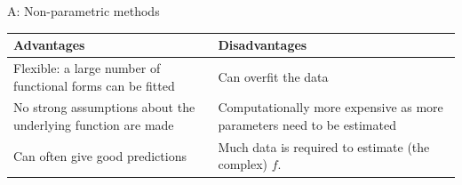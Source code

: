 \documentclass[ignorenonframetext,]{beamer}
\begin{document}
\begin{frame}

\begin{block}{A: Non-parametric methods}

\begin{longtable}[]{@{}ll@{}}
\toprule
\begin{minipage}[b]{0.47\columnwidth}\raggedright\strut
Advantages\strut
\end{minipage} & \begin{minipage}[b]{0.47\columnwidth}\raggedright\strut
Disadvantages\strut
\end{minipage}\tabularnewline
\midrule
\endhead
\begin{minipage}[t]{0.47\columnwidth}\raggedright\strut
Flexible: a large number of functional forms can be fitted\strut
\end{minipage} & \begin{minipage}[t]{0.47\columnwidth}\raggedright\strut
Can overfit the data\vspace{2mm}\strut
\end{minipage}\tabularnewline
\begin{minipage}[t]{0.47\columnwidth}\raggedright\strut
No strong assumptions about the underlying function are made\strut
\end{minipage} & \begin{minipage}[t]{0.47\columnwidth}\raggedright\strut
Computationally more expensive as more parameters need to be
estimated\vspace{2mm}\strut
\end{minipage}\tabularnewline
\begin{minipage}[t]{0.47\columnwidth}\raggedright\strut
Can often give good predictions\strut
\end{minipage} & \begin{minipage}[t]{0.47\columnwidth}\raggedright\strut
Much data is required to estimate (the complex) \(f\).\strut
\end{minipage}\tabularnewline
\bottomrule
\end{longtable}

\end{block}

\end{frame}
\end{document}
